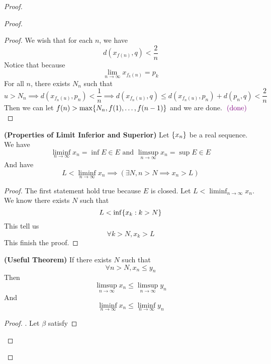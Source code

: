 \documentclass{report}
\begin{document}
\begin{proof}
\begin{proof}
\begin{proof}
We wish that for each $n$, we have
\begin{equation}
d(x_{f(n)},q)<\frac{2}{n}
\end{equation}
Notice that because 
\begin{equation}
  \lim_{n\to\infty}x_{f_k(n)}=p_k
\end{equation}
For all $n$, there exists  $N_n$ such that
 \begin{equation}
u>N_n\implies d(x_{f_n(u)},p_n)<\frac{1}{n}\implies d(x_{f_n(u)},q)\leq d(x_{f_n(u)},p_n)+d(p_n,q)<\frac{2}{n}
\end{equation}
Then we can let $f(n)>\max \{ N_n, f(1),\dots ,f(n-1) \}$ and we are done. $\textcolor{violet}{\text{ (done) }}$ 
\end{proof}
\begin{theorem}
\label{4.3.11}
\textbf{(Properties of Limit Inferior and Superior)} Let $\{ x_n \}$ be a real sequence. We have 
\begin{equation}
\liminf_{n\to\infty} x_n=\inf E\in E\text{ and }\limsup_{n\to\infty} x_n=\sup E\in E
\end{equation}
And have
\begin{equation}
L<\liminf_{n\to\infty}  x_n\implies (\exists N, n>N\implies x_n>L)
\end{equation}
\end{theorem}
\begin{proof}
The first statement hold true because  $E$ is closed. Let $L<\liminf_{n\to\infty}  x_n$. We know there exists $N$ such that
 \begin{equation}
L<\inf \{ x_k:k>N \}
\end{equation}
This tell us 
\begin{equation}
\forall k>N, x_k>L
\end{equation}
This finish the proof.
\end{proof}
\begin{theorem}
\label{4.3.12}
\textbf{(Useful Theorem)} If there exists $N$ such that
 \begin{equation}
\forall n>N, x_n\leq y_n
\end{equation}
Then
\begin{equation}
\limsup_{n\to\infty} x_n\leq \limsup_{n\to\infty} y_n
\end{equation}
And
\begin{equation}
\liminf_{n\to\infty} x_n\leq \liminf_{n\to\infty} y_n
\end{equation}
\end{theorem}
\begin{proof}
. Let $\beta $ satisfy

\end{proof}
\end{proof}
\end{proof}
\end{document}
